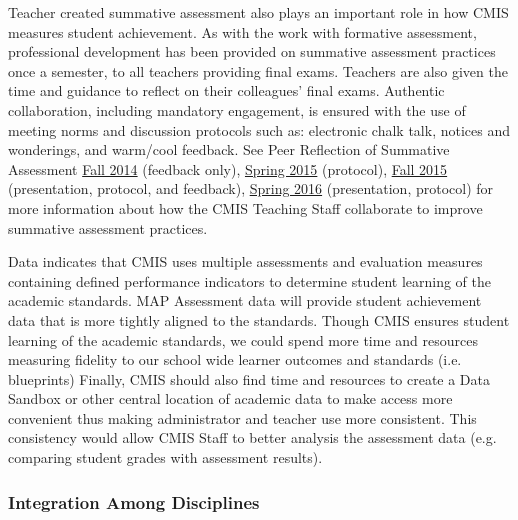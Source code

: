 \begin{findings}
Teacher created summative assessment also plays an important role in how CMIS measures student achievement. As with the work with formative assessment, professional development has been provided on summative assessment practices once a semester, to all teachers providing final exams. Teachers are also given the time and guidance to reflect on their colleagues’ final exams. Authentic collaboration, including mandatory engagement, is ensured with the use of meeting norms and discussion protocols such as: electronic chalk talk, notices and wonderings, and warm/cool feedback. See Peer Reflection of Summative Assessment \href{https://drive.google.com/a/cmis.ac.th/folderview?id=0ByVFfrm0zfolTHY0dmtURG5pcGs&usp=sharing}{Fall 2014} (feedback only), \href{https://drive.google.com/a/cmis.ac.th/folderview?id=0ByVFfrm0zfolaWQzeWxCTlVyUFU&usp=sharing}{Spring 2015} (protocol), \href{https://drive.google.com/a/cmis.ac.th/folderview?id=0ByVFfrm0zfolRjQzTDhmT0dyYzg&usp=sharing}{Fall 2015} (presentation, protocol, and feedback), \href{https://drive.google.com/a/cmis.ac.th/folderview?id=0ByVFfrm0zfolT29vQXpQeXp3VlU&usp=sharing}{Spring 2016} (presentation, protocol) for more information about how the CMIS Teaching Staff collaborate to improve summative assessment practices. 


Data indicates that CMIS uses multiple assessments and evaluation measures containing defined performance indicators to determine student learning of the academic standards. MAP Assessment data will provide student achievement data that is more tightly aligned to the standards. Though CMIS ensures student learning of the academic standards, we could spend more time and resources measuring fidelity to our school wide learner outcomes and standards (i.e. blueprints) Finally, CMIS should also find time and resources to create a Data Sandbox or other central location of academic data to make access more convenient thus making administrator and teacher use more consistent. This consistency would allow CMIS Staff to better analysis the assessment data (e.g. comparing student grades with assessment results). 
\end{findings}

\subsubsection{Integration Among Disciplines}


